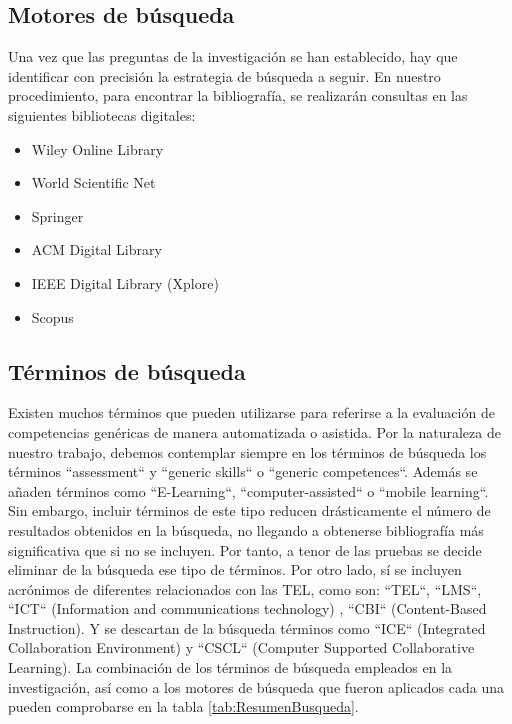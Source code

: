 \subsection{Motores de búsqueda}
Una vez que las preguntas de la investigación se han establecido, hay que identificar con precisión la estrategia de búsqueda a seguir. En nuestro procedimiento, para encontrar la bibliografía, se realizarán consultas en las siguientes bibliotecas digitales:
\begin{itemize}
\item Wiley Online Library
\item World Scientific Net
\item Springer
\item ACM Digital Library
\item IEEE Digital Library (Xplore)
\item Scopus
\end{itemize}

\subsection{Términos de búsqueda}
\label{sec:TerminosBusqueda}
Existen muchos términos que pueden utilizarse para referirse a la evaluación de competencias genéricas de manera automatizada o asistida. Por la naturaleza de nuestro trabajo, debemos contemplar siempre en los términos de búsqueda los términos ``assessment`` y ``generic skills`` o ``generic competences``. Además se añaden términos como  ``E-Learning``, ``computer-assisted`` o ``mobile learning``. Sin embargo, incluir términos de este tipo reducen drásticamente el número de resultados obtenidos en la búsqueda, no llegando a obtenerse bibliografía más significativa que si no se incluyen. Por tanto, a tenor de las pruebas se decide eliminar de la búsqueda ese tipo de términos. Por otro lado, sí se incluyen acrónimos de diferentes relacionados con las TEL, como son: ``TEL``, ``LMS``, ``ICT`` (Information and communications technology) , ``CBI`` (Content-Based Instruction). Y se descartan de la búsqueda términos como ``ICE`` (Integrated Collaboration Environment) y ``CSCL`` (Computer Supported Collaborative Learning). La combinación de los términos de búsqueda empleados en la investigación, así como a los motores de búsqueda que fueron aplicados cada una pueden comprobarse en la tabla \ref{tab:ResumenBusqueda}.

